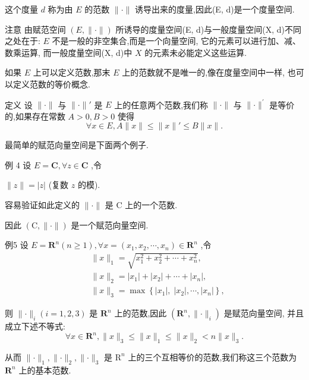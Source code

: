 这个度量 $d$ 称为由 $E$ 的范数 $\parallel  \cdot  \parallel$ 诱导出来的度量,因此(E, d)是一个度量空间.

注意 由赋范空间 $\left( {E,\parallel  \cdot  \parallel }\right)$ 所诱导的度量空间(E, d)与一般度量空间(X, d)不同之处在于: $E$ 不是一般的非空集合,而是一个向量空间, 它的元素可以进行加、减、数乘运算, 而一般度量空间(X, d)中 $X$ 的元素未必能定义这些运算.

如果 $E$ 上可以定义范数,那末 $E$ 上的范数就不是唯一的,像在度量空间中一样, 也可以定义范数的等价概念.

定义 设 $\parallel  \cdot  \parallel$ 与 $\parallel  \cdot  \parallel \prime$ 是 $E$ 上的任意两个范数,我们称 $\parallel  \cdot  \parallel$ 与 $\parallel  \cdot  {\parallel }^{\prime }$ 是等价的,如果存在常数 $A > 0,B > 0$ 使得
$$\forall x \in  E,A\parallel x\parallel  \leq  \parallel x\parallel \prime  \leq  B\parallel x\parallel .$$

最简单的赋范向量空间是下面两个例子.

例 4 设 $E = \mathbf{C},\forall z \in  \mathbf{C}$ ,令

$\parallel z\parallel  = \left| z\right|$ (复数 $z$ 的模).

容易验证如此定义的 $\parallel  \cdot  \parallel$ 是 $\mathrm{C}$ 上的一个范数.

因此 $\left( {\mathrm{C},\parallel  \cdot  \parallel }\right)$ 是一个赋范向量空间.

例5 设 $E = {\mathbf{R}}^{n}\left( {n \geq  1}\right) ,\forall x = \left( {{x}_{1},{x}_{2},\cdots ,{x}_{n}}\right)  \in  {\mathbf{R}}^{n}$ ,令
\begin{align*}
	&\parallel x{\parallel }_{1} = \sqrt{{x}_{1}^{2} + {x}_{2}^{2} + \cdots  + {x}_{n}^{2}},\\
	&\parallel x{\parallel }_{2} = \left| {x}_{1}\right|  + \left| {x}_{2}\right|  + \cdots  + \left| {x}_{n}\right| ,\\
	&\parallel x{\parallel }_{3} = \max \left\{  {\left| {x}_{1}\right| ,\;\left| {x}_{2}\right| ,\cdots ,\left| {x}_{n}\right| }\right\}  ,
\end{align*}

则 $\parallel  \cdot  {\parallel }_{i}\left( {i = 1,2,3}\right)$ 是 ${\mathbf{R}}^{n}$ 上的范数,因此 $\left( {{\mathbf{R}}^{n},\parallel  \cdot  {\parallel }_{i}}\right)$ 是赋范向量空间, 并且成立下述不等式:
$$\forall x \in  {\mathbf{R}}^{n},\parallel x{\parallel }_{3} \leq  \parallel x{\parallel }_{1} \leq  \parallel x{\parallel }_{2} < n\parallel x{\parallel }_{3}.$$

从而 $\parallel  \cdot  {\parallel }_{1},\parallel  \cdot  {\parallel }_{2},\parallel  \cdot  {\parallel }_{3}$ 是 ${\mathrm{R}}^{n}$ 上的三个互相等价的范数,我们称这三个范数为 ${\mathbf{R}}^{n}$ 上的基本范数.

